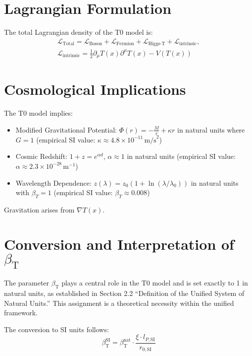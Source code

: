\documentclass[a4paper,12pt]{article}
\newcommand{\Tfield}{T(x)}
\newcommand{\betaT}{\beta_{\text{T}}}
\begin{document}
	\section{Lagrangian Formulation}
	The total Lagrangian density of the T0 model is:
	\begin{multline}
		\mathcal{L}_{\text{Total}} = \mathcal{L}_{\text{Boson}} + \mathcal{L}_{\text{Fermion}} + \mathcal{L}_{\text{Higgs-T}} + \mathcal{L}_{\text{intrinsic}}, \\
		\mathcal{L}_{\text{intrinsic}} = \frac{1}{2} \partial_\mu \Tfield \partial^\mu \Tfield - V(\Tfield)
	\end{multline}
	
	\section{Cosmological Implications}

The T0 model implies:
\begin{itemize}
	\item Modified Gravitational Potential: \( \Phi(r) = -\frac{M}{r} + \kappa r \) in natural units where \(G = 1\) (empirical SI value: \(\kappa \approx 4.8 \times 10^{-11} \, \text{m/s}^2\))
	\item Cosmic Redshift: \( 1 + z = e^{\alpha d} \), \(\alpha \approx 1\) in natural units (empirical SI value: \(\alpha \approx 2.3 \times 10^{-28} \, \text{m}^{-1}\))
	\item Wavelength Dependence: \( z(\lambda) = z_0 (1 + \ln(\lambda/\lambda_0)) \) in natural units with \(\beta_T = 1\) (empirical SI value: \(\beta_T \approx 0.008\))
\end{itemize}
Gravitation arises from \( \nabla \Tfield \).
\section{Conversion and Interpretation of \(\betaT\)}
\label{subsec:beta_conversion_interpretation}
The parameter \(\betaT\) plays a central role in the T0 model and is set exactly to 1 in natural units, as established in Section 2.2 ``Definition of the Unified System of Natural Units.'' This assignment is a theoretical necessity within the unified framework.

The conversion to SI units follows:
\begin{equation}
	\betaT^{\text{SI}} = \betaT^{\text{nat}} \cdot \frac{\xi \cdot l_{P,\text{SI}}}{r_{0,\text{SI}}}
\end{equation}
\end{document}
